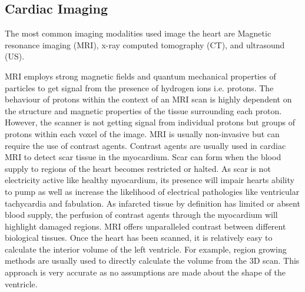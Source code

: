 \documentclass[12pt]{article}
\begin{document}
\subsection{Cardiac Imaging}

The most common imaging modalities used image the heart are Magnetic resonance imaging (MRI), x-ray computed tomography (CT), and ultrasound (US).

MRI employs strong magnetic fields and quantum mechanical properties of particles to get signal from the presence of hydrogen ions i.e. protons.
The behaviour of protons within the context of an MRI scan is highly dependent on the structure and magnetic properties of the tissue surrounding each proton.
However, the scanner is not getting signal from individual protons but groups of protons within each voxel of the image.
MRI is usually non-invasive but can require the use of contrast agents.
Contrast agents are usually used in cardiac MRI to detect scar tissue in the myocardium.
Scar can form when the blood supply to regions of the heart becomes restricted or halted.
As scar is not electricity active like healthy myocardium, its presence will impair hearts ability to pump as well as increase the likelihood of electrical pathologies like ventricular tachycardia and fabulation.
As infarcted tissue by definition has limited or absent blood supply, the perfusion of contrast agents through the myocardium will highlight damaged regions.
MRI offers unparalleled contrast between different biological tissues.
Once the heart has been scanned, it is relatively easy to calculate the interior volume of the left ventricle.
For example, region growing methods are usually used  to directly calculate the volume from the 3D scan.
This approach is very accurate as no assumptions are made about the shape of the ventricle.
\end{document}
